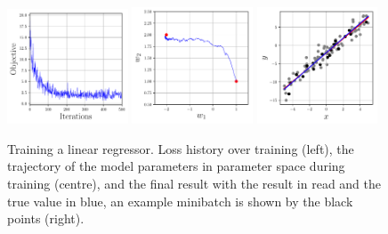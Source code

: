 \begin{figure}[h!]
    \begin{center}
        \includegraphics[width=0.32\textwidth]{figures/machine_learning/loss_history.pdf}
        \includegraphics[width=0.32\textwidth]{figures/machine_learning/w1_w2_history.pdf}
        \includegraphics[width=0.32\textwidth]{figures/machine_learning/data_and_results.pdf}
    \end{center}
    \caption{Training a linear regressor. Loss history over training (left), the trajectory of the model parameters in parameter space during training (centre), and the final result with the result in read and the true value in blue, an example minibatch is shown by the black points (right).}
        \label{fig:machine_learning:lin_example}
\end{figure}








